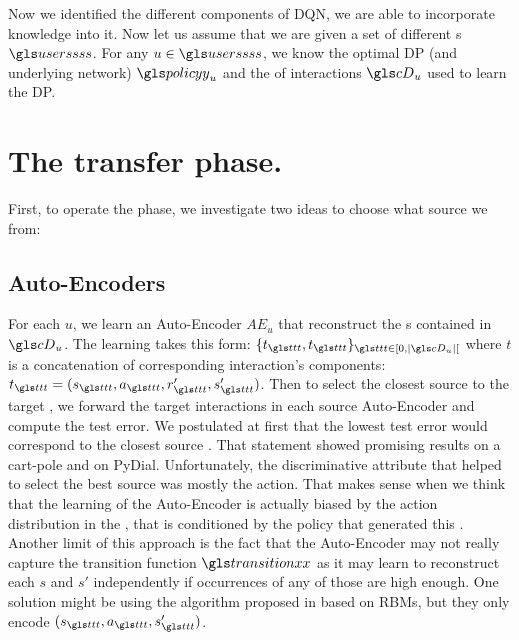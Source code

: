 Now we identified the different components of \gls{DQN}, we are able to incorporate  knowledge into it. Now let us assume that we are given a set of different s $\users$. For any $u\in\users$, we know the optimal \gls{DP} (and underlying  network) $\policy_u$ and the  of interactions $\cD_u$ used to learn the \gls{DP}.

\section{The transfer phase.}

First, to operate the \textit{} phase, we investigate two ideas to choose what source we  from:

\subsection{Auto-Encoders}

 For each  $u$, we learn an Auto-Encoder $AE_u$ that reconstruct the s contained in $\cD_u$. The learning  takes this form:
 $\{t_{\indextransition},t_{\indextransition}\}_{{\indextransition}\in[0,|\cD_u|[}$
 where $t$ is a concatenation of corresponding interaction's components: $t_{\indextransition}= (s_{\indextransition},a_{\indextransition},r_{\indextransition}',s_{\indextransition}')$. Then to select the closest source  to the target , we forward the target interactions in each source Auto-Encoder and compute the test error. We postulated at first that the lowest test error would correspond to the closest source . That statement showed promising results on a cart-pole  and on PyDial. Unfortunately, the discriminative attribute that helped to select the best source was mostly the action. That makes sense when we think that the learning of the Auto-Encoder is actually biased by the action distribution in the , that is conditioned by the policy that generated this . Another limit of this approach is the fact that the Auto-Encoder may not really capture the transition function $\transition$ as it may learn to reconstruct each $s$  and $s'$ independently if occurrences of any of those are high enough. One solution might be using the algorithm proposed in \textcite{ammar2014automated} based on \glspl{RBM}, but they only encode $(s_{\indextransition},a_{\indextransition},s_{\indextransition}')$.

